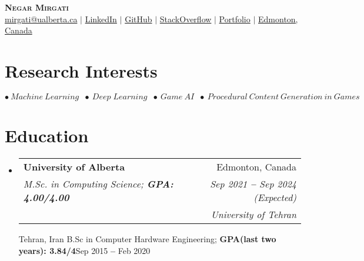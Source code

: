 \documentclass[letterpaper,11pt]{article}
\makeatletter
\newcommand{\resumeSubheading}[4]{
  \vspace{-2pt}\item
    \begin{tabular*}{0.97\textwidth}[t]{l@{\extracolsep{\fill}}r}
      \textbf{#1} & #2 \\
      \textit{\small#3} & \textit{\small #4} \\
    \end{tabular*}\vspace{-7pt}
}
\newcommand{\resumeEducationHeading}[6]{
  \vspace{-2pt}\item
    \begin{tabular*}{0.97\textwidth}[t]{l@{\extracolsep{\fill}}r}
      \textbf{#1} & #2 \\
      \textit{\small#3} & \textit{\small #4} \\
      \textit{\small#5} & \textit{\small #6} \\
    \end{tabular*}\vspace{-5pt}
}
\newcommand{\resumeSubHeadingListStart}{\begin{itemize}[leftmargin=0.15in, label={}]}
\newcommand{\resumeSubHeadingListEnd}{\end{itemize}}
\makeatother
\begin{document}

\begin{center}
    \textbf{\Huge \scshape Negar Mirgati} \\ \vspace{3pt}
    \small
    \faAt \hspace{.5pt} \href{mailto:mirgati@ualberta.ca}{mirgati@ualberta.ca}
    $|$
    \faLinkedinSquare \hspace{.5pt} \href{https://www.linkedin.com/in/negar-mirgati-4a84a2108/}{LinkedIn}
    $|$
    \faGithub \hspace{.5pt} \href{https://github.com/negarmirgati}{GitHub}
    $|$
    \faStackOverflow \hspace{.5pt} \href{https://stackoverflow.com/users/6287044/winston}{StackOverflow}
    $|$
    \faGlobe \hspace{.5pt} \href{https://negarmirgati.github.io}{Portfolio}
    $|$
    \faMapMarker \hspace{.5pt} \href{https://goo.gl/maps/FE5WmENspj7VT9YU9}{Edmonton, Canada}
\end{center}



\section{Research Interests}
  \vspace{3pt}
  
$\bullet \: Machine \: Learning \; \; \bullet \: Deep \; Learning \; \; \bullet \: Game \: AI \;\; \bullet \: Procedural \: Content \: Generation \: in \: Games $




\section{Education}
  \vspace{3pt}
  \resumeSubHeadingListStart
    
    \resumeEducationHeading
      {University of Alberta
      }{Edmonton, Canada}
      {M.Sc. in Computing Science;   \textbf{GPA: 4.00/4.00}}{Sep 2021 \textbf{--} Sep 2024 (Expected)}


    \resumeSubheading
      {University of Tehran
      }{Tehran, Iran}
      {B.Sc in Computer Hardware Engineering;   \textbf{GPA(last two years): 3.84/4}}{Sep 2015 \textbf{--} Feb 2020}
  \resumeSubHeadingListEnd
\end{document}
